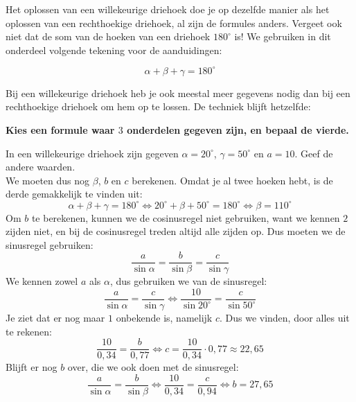 Het oplossen van een willekeurige driehoek doe je op dezelfde manier als het oplossen van een rechthoekige driehoek, al zijn de formules anders.  Vergeet ook niet dat de som van de hoeken van een driehoek $180^\circ$ is! We gebruiken in dit onderdeel volgende tekening voor de aanduidingen:



\[\alpha + \beta + \gamma = 180^\circ\]

Bij een willekeurige driehoek heb je ook meestal meer gegevens nodig dan bij een rechthoekige driehoek om hem op te lossen.  De techniek blijft hetzelfde:
\begin{center}
\textbf{Kies een formule waar $3$ onderdelen gegeven zijn, en bepaal de vierde.}
\end{center}

\begin{voorbeeld}
	In een willekeurige driehoek zijn gegeven $\alpha=20^\circ$, $\gamma = 50^\circ$ en $a=10$. Geef de andere waarden.\\
We moeten dus nog $\beta$, $b$ en $c$ berekenen. Omdat je al twee hoeken hebt, is de derde gemakkelijk te vinden uit:
\[\alpha+\beta+\gamma=180^\circ\Leftrightarrow 20^\circ + \beta + 50^\circ=180^\circ \Leftrightarrow \beta = 110^\circ\]
Om $b$ te berekenen, kunnen we de cosinusregel niet gebruiken, want we kennen $2$ zijden niet, en bij de cosinusregel treden altijd alle zijden op. Dus moeten we de sinusregel gebruiken:
\[\frac{a}{\sin \alpha} = \frac{b}{\sin \beta} = \frac{c}{\sin \gamma}\]
We kennen zowel $a$ als $\alpha$, dus gebruiken we van de sinusregel:
\[\frac{a}{\sin \alpha} = \frac{c}{\sin \gamma}\Leftrightarrow \frac{10}{\sin 20^\circ}=\frac{c}{\sin 50^\circ}\]
Je ziet dat er nog maar $1$ onbekende is, namelijk $c$.  Dus we vinden, door alles uit te rekenen:
\[\frac{10}{0,34}=\frac{b}{0,77}\Leftrightarrow c= \frac{10}{0,34}\cdot 0,77 \approx 22,65\]
Blijft er nog $b$ over, die we ook doen met de sinusregel:
\[\frac{a}{\sin \alpha}=\frac{b}{\sin \beta}\Leftrightarrow \frac{10}{0,34}=\frac{c}{0,94}\Leftrightarrow b= 27,65\]
\end{voorbeeld}

